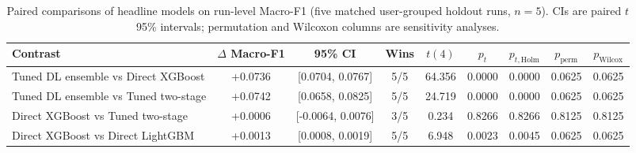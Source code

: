 \begin{table}[t]
\centering
\caption{Paired comparisons of headline models on run-level Macro-F1 (five matched user-grouped holdout runs, $n=5$). CIs are paired $t$ 95\% intervals; permutation and Wilcoxon columns are sensitivity analyses.}
\label{tab:headline_paired_tests}
\begin{tabular}{lcccccccc}
\toprule
Contrast & $\Delta$ Macro-F1 & 95\% CI & Wins & $t(4)$ & $p_{t}$ & $p_{t,\mathrm{Holm}}$ & $p_{\mathrm{perm}}$ & $p_{\mathrm{Wilcox}}$ \\
\midrule
Tuned DL ensemble vs Direct XGBoost & +0.0736 & [0.0704, 0.0767] & 5/5 & 64.356 & 0.0000 & 0.0000 & 0.0625 & 0.0625 \\
Tuned DL ensemble vs Tuned two-stage & +0.0742 & [0.0658, 0.0825] & 5/5 & 24.719 & 0.0000 & 0.0000 & 0.0625 & 0.0625 \\
Direct XGBoost vs Tuned two-stage & +0.0006 & [-0.0064, 0.0076] & 3/5 & 0.234 & 0.8266 & 0.8266 & 0.8125 & 0.8125 \\
Direct XGBoost vs Direct LightGBM & +0.0013 & [0.0008, 0.0019] & 5/5 & 6.948 & 0.0023 & 0.0045 & 0.0625 & 0.0625 \\
\bottomrule
\end{tabular}
\end{table}